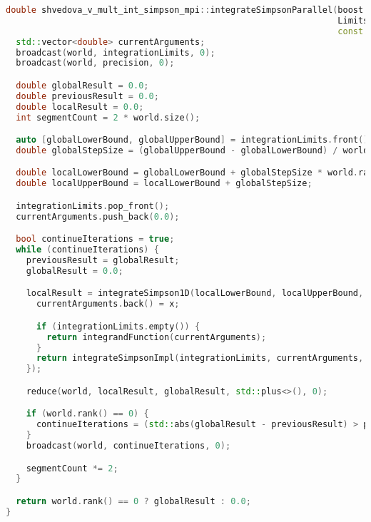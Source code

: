 \documentclass[12pt]{article}
\begin{document}
\begin{lstlisting}[language=C++]
double shvedova_v_mult_int_simpson_mpi::integrateSimpsonParallel(boost::mpi::communicator& world,
                                                                 Limits integrationLimits, double precision,
                                                                 const FunctionType& integrandFunction) {
  std::vector<double> currentArguments;
  broadcast(world, integrationLimits, 0);
  broadcast(world, precision, 0);

  double globalResult = 0.0;
  double previousResult = 0.0;
  double localResult = 0.0;
  int segmentCount = 2 * world.size();

  auto [globalLowerBound, globalUpperBound] = integrationLimits.front();
  double globalStepSize = (globalUpperBound - globalLowerBound) / world.size();

  double localLowerBound = globalLowerBound + globalStepSize * world.rank();
  double localUpperBound = localLowerBound + globalStepSize;

  integrationLimits.pop_front();
  currentArguments.push_back(0.0);

  bool continueIterations = true;
  while (continueIterations) {
    previousResult = globalResult;
    globalResult = 0.0;

    localResult = integrateSimpson1D(localLowerBound, localUpperBound, segmentCount / world.size(), [&](double x) {
      currentArguments.back() = x;

      if (integrationLimits.empty()) {
        return integrandFunction(currentArguments);
      }
      return integrateSimpsonImpl(integrationLimits, currentArguments, integrandFunction, precision);
    });

    reduce(world, localResult, globalResult, std::plus<>(), 0);

    if (world.rank() == 0) {
      continueIterations = (std::abs(globalResult - previousResult) > precision);
    }
    broadcast(world, continueIterations, 0);

    segmentCount *= 2;
  }

  return world.rank() == 0 ? globalResult : 0.0;
}
\end{lstlisting}
\end{document}
